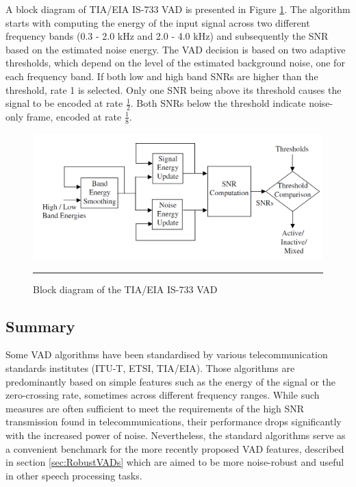 A block diagram of TIA/EIA IS-733 VAD is presented in Figure \ref{fig:IS733}. The algorithm starts with computing the energy of the input signal across two different frequency bands (0.3 - 2.0 kHz and 2.0 - 4.0 kHz) and subsequently the SNR based on the estimated noise energy. The VAD decision is based on two adaptive thresholds, which depend on the level of the estimated background noise, one for each frequency band. If both low and high band SNRs are higher than the threshold, rate 1 is selected. Only one SNR being above its threshold causes the signal to be encoded at rate $\frac{1}{2}$. Both SNRs below the threshold indicate noise-only frame, encoded at rate $\frac{1}{8}$.

\begin{figure}[htbp]
	\centering
		\includegraphics[width=0.9\columnwidth]{Figures/Chapter2/IS733.png}
		\rule{37em}{0.5pt}
	\caption[Block diagram of the TIA/EIA IS-733 VAD]{Block diagram of the TIA/EIA IS-733 VAD \cite{Kondoz}}
	\label{fig:IS733}
\end{figure}

\subsection{Summary}

Some VAD algorithms have been standardised by various telecommunication standards institutes (ITU-T, ETSI, TIA/EIA). Those algorithms are predominantly based on simple features such as the energy of the signal or the zero-crossing rate, sometimes across different frequency ranges. While such measures are often sufficient to meet the requirements of the high SNR transmission found in telecommunications, their performance drops significantly with the increased power of noise. Nevertheless, the standard algorithms serve as a convenient benchmark for the more recently proposed VAD features, described in section \ref{sec:RobustVADs} which are aimed to be more noise-robust and useful in other speech processing tasks.


